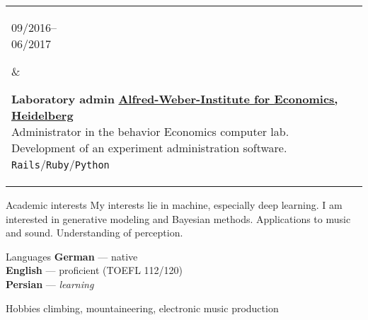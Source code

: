 \documentclass{article}
\newenvironment{entrylist}{
	\begin{longtable}[H]{l l}
}{
	\end{longtable}
}
\newcommand{\entry}[4]{%
	\parbox[t]{0.175\linewidth}{#1} &
	\parbox[t]{0.825\linewidth}{
		\textbf{#2}%
		\hfill%
		{\footnotesize \textbf{\textcolor{black}{#3}}}\\%
		{\small #4} %
    }\\\\}
\newcommand{\slashsep}{\hspace{2mm}/\hspace{2mm}}
\begin{document}
\begin{entrylist}
    \entry
    {09/2016--\\06/2017}
    {Laboratory admin}
    {\href{https://www.uni-heidelberg.de/fakultaeten/wiso/awi/index_en.html}{Alfred-Weber-Institute for Economics, Heidelberg}}
    {
        Administrator in the behavior Economics computer lab. Development of an experiment administration software.\\
        \texttt{Rails}\slashsep\texttt{Ruby}\slashsep\texttt{Python}
    }

    \entry
    {10/2015--\\02/2016}
    {Teaching Assistant}
    {\href{https://www.uni-heidelberg.de/en}{University Heidelberg}}
    {
        Self-prepared weekly training classes for course practical computer science.\\
        \texttt{C++}
    }

    \entry
    {06/2015--}
    {CO-Founder\ /\ Voluntary work}
    {\href{https://collegiumacademicum.de}{Collegium Academicum, Heidelberg}}
    {
        Student-founded non-profit company building sustainable student housing.
        We are building an innovative living space for 200 young people.
        Creating an educational center for holistic self-learning.\\
        \texttt{team building}\slashsep\texttt{lead generation}\slashsep\texttt{design work}\slashsep\texttt{writing grant applications}
    }
\end{entrylist}

\begin{cvbox}{Academic interests}
My interests lie in machine, especially deep learning. I am interested in generative modeling and
Bayesian methods. Applications to music and sound. Understanding of perception.
\end{cvbox}
\begin{cvbox}{Languages}
	\textbf{German} --- native\\
	\textbf{English} --- proficient (TOEFL 112/120)\\
    \textbf{Persian} --- \textit{learning}
\end{cvbox}
\begin{cvbox}{Hobbies}
    climbing, mountaineering, electronic music production
\end{cvbox}
\end{document}
